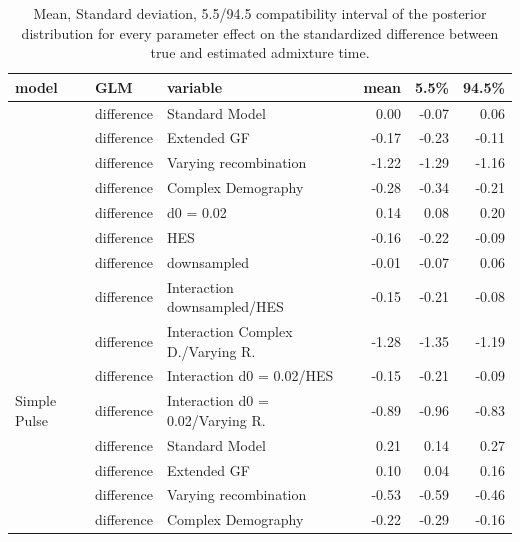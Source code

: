 \documentclass[11pt]{article}
\begin{document}
\begin{table}[H]

\caption{\label{tab:table_Supplements_GLM_EP_SP_tm_effect_size_bias}Mean, Standard deviation, 5.5/94.5 compatibility interval of the posterior distribution for every parameter effect on the standardized difference between true and estimated admixture time.} 
\centering

\begin{tabular}[t]{l|l|l|r|r|r}
\hline
model & GLM & variable & mean & 5.5\% & 94.5\%\\
\hline
 & difference & Standard Model & 0.00 & -0.07 & 0.06\\

 & difference & Extended GF & -0.17 & -0.23 & -0.11\\

 & difference & Varying recombination & -1.22 & -1.29 & -1.16\\

 & difference & Complex Demography & -0.28 & -0.34 & -0.21\\

 & difference & d0 = 0.02 & 0.14 & 0.08 & 0.20\\

 & difference & HES & -0.16 & -0.22 & -0.09\\

 & difference & downsampled & -0.01 & -0.07 & 0.06\\

 & difference & Interaction downsampled/HES & -0.15 & -0.21 & -0.08\\

 & difference & Interaction Complex D./Varying R. & -1.28 & -1.35 & -1.19\\

 & difference & Interaction d0 = 0.02/HES & -0.15 & -0.21 & -0.09\\

\multirow{-11}{*}{\raggedright\arraybackslash Simple Pulse} & difference & Interaction d0 = 0.02/Varying R. & -0.89 & -0.96 & -0.83\\
\cline{1-6}
 & difference & Standard Model & 0.21 & 0.14 & 0.27\\

 & difference & Extended GF & 0.10 & 0.04 & 0.16\\

 & difference & Varying recombination & -0.53 & -0.59 & -0.46\\

 & difference & Complex Demography & -0.22 & -0.29 & -0.16\\


\end{tabular}
\end{table}
\end{document}
